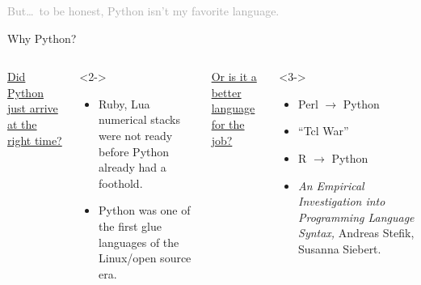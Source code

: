 \documentclass[aspectratio=169]{beamer}
\begin{document}
\begin{frame}{}
\Large
\vspace{1 cm}
\textcolor{darkgray}{But\ldots\ to be honest, Python isn't my favorite language.}

\large
\vspace{1 cm}

\large
\vspace{1 cm}
\end{frame}

\begin{frame}{Why Python?}
\large
\vspace{0.5 cm}
\begin{columns}[t]
\underline{Did Python just arrive at the right time?}

\vspace{0.25 cm}
\begin{uncoverenv}<2->
\begin{itemize}
\item Ruby, Lua numerical stacks were not ready before Python already had a foothold.
\item Python was one of the first glue languages of the Linux/open source era.
\end{itemize}
\end{uncoverenv}

\underline{Or is it a better language for the job?}

\vspace{0.25 cm}
\begin{uncoverenv}<3->
\begin{itemize}
\item Perl $\to$ Python
\item ``Tcl War''
\item R $\to$ Python
\item<4-> {\it An Empirical Investigation into Programming Language Syntax,} Andreas Stefik, Susanna Siebert.
\end{itemize}
\end{uncoverenv}
\end{columns}
\end{frame}
\end{document}

